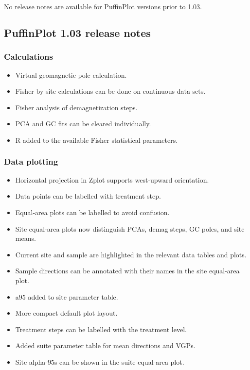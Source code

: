 \documentclass[a4paper,british]{article}
\begin{document}
No release notes are available for PuffinPlot versions prior to 1.03.

\subsection{PuffinPlot 1.03 release notes}
\label{sec-1}
\subsubsection{Calculations}
\label{sec-1-1}
\begin{itemize}
\item Virtual geomagnetic pole calculation.
\item Fisher-by-site calculations can be done on continuous data sets.
\item Fisher analysis of demagnetization steps.
\item PCA and GC fits can be cleared individually.
\item R added to the available Fisher statistical parameters.
\end{itemize}

\subsubsection{Data plotting}
\label{sec-1-2}
\begin{itemize}
\item Horizontal projection in Zplot supports west-upward orientation.
\item Data points can be labelled with treatment step.
\item Equal-area plots can be labelled to avoid confusion.
\item Site equal-area plots now distinguish PCAs, demag steps, GC poles,
and site means.
\item Current site and sample are highlighted in the relevant data tables
and plots.
\item Sample directions can be annotated with their names in the site
equal-area plot.
\item a95 added to site parameter table.
\item More compact default plot layout.
\item Treatment steps can be labelled with the treatment level.
\item Added suite parameter table for mean directions and VGPs.
\item Site alpha-95s can be shown in the suite equal-area plot.
\end{itemize}
\end{document}
